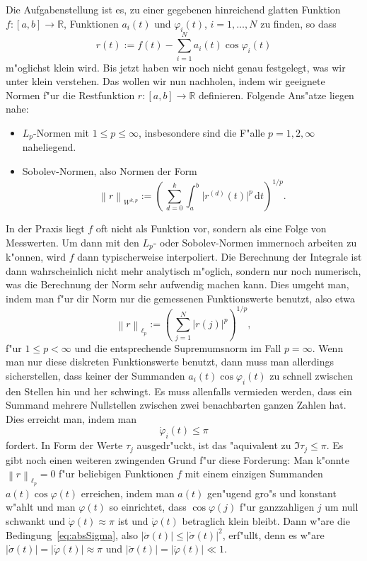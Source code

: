 \documentclass[a4paper]{scrartcl}
\newcommand{\R}{{\mathbb{R}}}
\newcommand{\de}{{\mathrm{d}}}
\newcommand{\norm}[1]{{\left\lVert#1\right\rVert}}
\newcommand{\pphi}{{\varphi}}
\begin{document}
Die Aufgabenstellung ist es, zu einer gegebenen hinreichend glatten Funktion $f:[a,b]\to\R$, Funktionen $a_i(t)$ und $\pphi_i(t)$, $i=1,\dotsc,N$ zu finden, so dass 
$$ r(t) := f(t)-\sum_{i=1}^N a_i(t)\cos\pphi_i(t) $$
m"oglichst klein wird. Bis jetzt haben wir noch nicht genau festgelegt, was wir unter \glqq{}klein\grqq{} verstehen. Das wollen wir nun nachholen, indem wir geeignete Normen f"ur die Restfunktion $r:[a,b]\to\R$ definieren. Folgende Ans"atze liegen nahe:
\begin{itemize}
\item $L_p$-Normen mit $1\le p\le\infty$, insbesondere sind die F"alle $p=1,2,\infty$ naheliegend. 
\item Sobolev-Normen, also Normen der Form
$$ \norm{r}_{W^{k,p}} := \left(\,\sum_{d=0}^k\int_a^b \lvert r^{(d)}(t)\rvert^p\,\de t\right)^{1/p}. $$
\end{itemize}
In der Praxis liegt $f$ oft nicht als Funktion vor, sondern als eine Folge von Messwerten. Um dann mit den $L_p$- oder Sobolev-Normen immernoch arbeiten zu k"onnen, wird $f$ dann typischerweise interpoliert. Die Berechnung der Integrale ist dann wahrscheinlich nicht mehr analytisch m"oglich, sondern nur noch numerisch, was die Berechnung der Norm sehr aufwendig machen kann. Dies umgeht man, indem man f"ur dir Norm nur die gemessenen Funktionswerte benutzt, also etwa
$$ \norm{r}_{\ell_p} := \left(\,\sum_{j=1}^{N}\lvert r(j)\rvert^p\right)^{1/p}, $$
f"ur $1\le p<\infty$ und die entsprechende Supremumsnorm im Fall $p=\infty$. Wenn man nur diese diskreten Funktionswerte benutzt, dann muss man allerdings sicherstellen, dass keiner der Summanden $a_i(t)\cos\pphi_i(t)$ zu schnell zwischen den Stellen hin und her schwingt. Es muss allenfalls vermieden werden, dass ein Summand mehrere Nullstellen zwischen zwei benachbarten ganzen Zahlen hat. Dies erreicht man, indem man 
\begin{equation} \label{eq:dotPhiLePi}
\dot\pphi_i(t)\le\pi
\end{equation}
fordert. In Form der Werte $\tau_j$ ausgedr"uckt, ist das "aquivalent zu $\Im\tau_j\le\pi$. Es gibt noch einen weiteren zwingenden Grund f"ur diese Forderung: Man k"onnte $\norm{r}_{\ell_p}=0$ f"ur beliebigen Funktionen $f$ mit einem einzigen Summanden $a(t)\cos\pphi(t)$ erreichen, indem man $a(t)$ gen"ugend gro"s und konstant w"ahlt und man $\pphi(t)$ so einrichtet, dass $\cos\pphi(j)$ f"ur ganzzahligen $j$ um null schwankt und $\dot\pphi(t)\approx\pi$ ist und $\ddot\pphi(t)$ betraglich klein bleibt. Dann w"are die Bedingung~\eqref{eq:absSigma}, also $\lvert\ddot\sigma(t)\rvert\le\lvert\dot\sigma(t)\rvert^2$,  erf"ullt, denn es w"are $ \lvert\dot\sigma(t)\rvert = \lvert\dot\pphi(t)\rvert \approx \pi $ und $\lvert\ddot\sigma(t)\rvert=\lvert\ddot\pphi(t)\rvert \ll 1$. 
\end{document}
